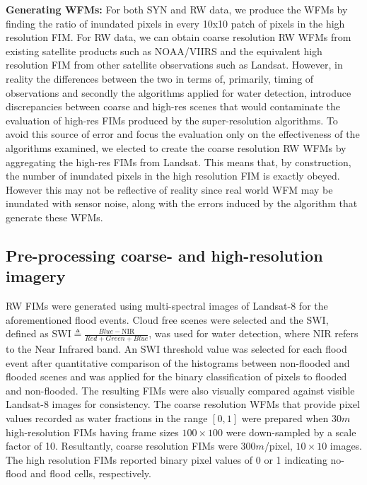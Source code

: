 \textbf{Generating \acp{WFM}:} For both \ac{SYN} and \ac{RW} data, we produce the \acp{WFM} by finding the ratio of inundated pixels in every 10x10 patch of pixels in the high resolution \ac{FIM}. For \ac{RW} data, we can obtain coarse resolution \ac{RW} \acp{WFM} from existing satellite products such as NOAA/VIIRS and the equivalent high resolution \ac{FIM} from other satellite observations such as Landsat. However, in reality the differences between the two in terms of, primarily, timing of observations and secondly the algorithms applied for water detection, introduce discrepancies between coarse and high-res scenes that would contaminate the evaluation of high-res \acp{FIM} produced by the super-resolution algorithms. To avoid this source of error and focus the evaluation only on the effectiveness of the algorithms examined, we elected to create the coarse resolution \ac{RW} \acp{WFM} by aggregating the high-res \acp{FIM} from Landsat. This means that, by construction, the number of inundated pixels in the high resolution \ac{FIM} is exactly obeyed. However this may not be reflective of reality since real world \ac{WFM} may be inundated with sensor noise, along with the errors induced by the algorithm that generate these \acp{WFM}.


\subsection{Pre-processing coarse- and high-resolution imagery}

\ac{RW} \acp{FIM} were generated using multi-spectral images of Landsat-8 for the aforementioned flood events. Cloud free scenes were selected and the \ac{SWI}, defined as $\mathrm{SWI} \triangleq \frac{Blue - \mathrm{NIR}} { Red+Green+Blue}$,  was used for water detection, where NIR refers to the Near Infrared band. An \ac{SWI} threshold value was selected for each flood event after quantitative comparison of the histograms between non-flooded and flooded scenes and was applied for the binary classification of pixels to flooded and non-flooded. The resulting \acp{FIM} were also visually compared against visible Landsat-8 images for consistency. The coarse resolution \acp{WFM} that provide pixel values recorded as water fractions in the range $[0, 1]$ were prepared when $30m$ high-resolution \acp{FIM} having frame sizes $100 \times 100$ were down-sampled by a scale factor of 10. Resultantly, coarse resolution \acp{FIM} were $300m$/pixel, $10 \times 10$ images. %
The high resolution \acp{FIM} reported binary pixel values of 0 or 1 indicating no-flood and flood cells, respectively. 

